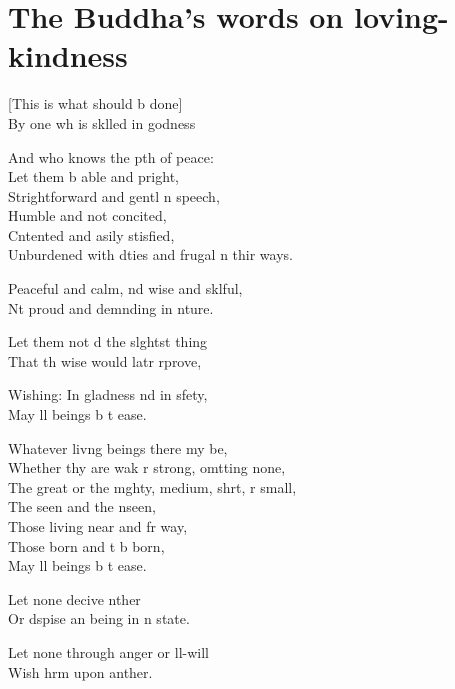 
\chapter[Loving-kindness]{The Buddha's words on loving-kindness}

\begin{leader}
\end{leader}

[This is what should b done]\\
By one wh is sklled in godness

And who knows the pth of peace:\\
Let them b able and pright,\\
Strightforward and gentl n speech,\\
Humble and not concited,\\
Cntented and asily stisfied,\\
Unburdened with dties and frugal n thir ways.

Peaceful and calm, nd wise and sklful,\\
Nt proud and demnding in nture.

Let them not d the slghtst thing\\
That th wise would latr rprove,

Wishing: In gladness nd in sfety,\\
May ll beings b t ease.

Whatever livng beings there my be,\\
Whether thy are wak r strong, omtting none,\\
The great or the mghty, medium, shrt, r small,\\
The seen and the nseen,\\
Those living near and fr way,\\
Those born and t b born,\\
May ll beings b t ease.

Let none decive nther\\
Or dspise an being in n state.

Let none through anger or ll-will\\
Wish hrm upon anther.

